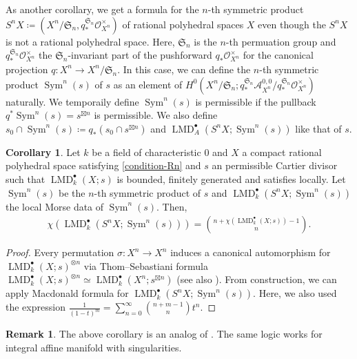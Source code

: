 \documentclass[a4paper,dvipdfmx,reqno,12pt]{amsart}
\theoremstyle{definition}
\newtheorem{corollary}[theorem]{Corollary}
\newtheorem{remark}[theorem]{Remark}
\newcommand{\deq}{\coloneqq}
\newcommand{\opn}[1]{\operatorname{#1}}
\numberwithin{equation}{section}
\begin{document}
As another corollary, we get a formula
for the $n$-th symmetric product 
$S^{n}X\deq 
(X^{n}/\mathfrak{S}_n,q_*^{\mathfrak{S}_n}\mathcal{O}_{X^{n}}^{\times})$ of 
rational polyhedral spaces $X$ even though 
the $S^{n}X$ is not a rational polyhedral space. 
Here, $\mathfrak{S}_n$ is the $n$-th permuation group 
and $q_*^{\mathfrak{S}_n}\mathcal{O}_{X^{n}}^{\times}$ the $\mathfrak{S}_n$-invariant 
part of the pushforward $q_* \mathcal{O}_{X^{n}}^{\times}$ for the canonical projection 
$q\colon X^{n}\to X^{n}/\mathfrak{S}_{n}$. In this case, 
we can define the $n$-th symmetric product
$\opn{Sym}^{n}(s)$ of 
$s$ as an element of $H^{0}(X^{n}/\mathfrak{S}_n;
q_*^{\mathfrak{S}_n}\mathcal{A}^{0,0}_{X^{n}}/
q_*^{\mathfrak{S}_n}\mathcal{O}_{X^{n}}^{\times})$
naturally.
We temporaily define $\opn{Sym}^{n}(s)$ is permissible if
the pullback $q^{*} \opn{Sym}^{n}(s)=s^{\boxtimes n}$ is 
permissible. We also define 
$s_0 \cap \opn{Sym}^{n}(s)\deq q_*(s_0\cap s^{\boxtimes n})$ 
and $\opn{LMD}^{\bullet}_{A}(S^{n}X;\opn{Sym}^{n}(s))$ like 
that of $s$.
\begin{corollary}
Let $k$ be a field of characteristic $0$ and $X$ a compact rational 
polyhedral space satisfying \cref{condition-Rn} 
and $s$ an permissible Cartier divisor 
such that $\opn{LMD}^{\bullet}_k(X;s)$ is bounded, 
finitely generated and 
satisfies \cite[Assumption 1.1.1]{MR2031639} locally.
Let $\opn{Sym}^{n}(s)$ be the $n$-th symmetric product of 
$s$ and
$\opn{LMD}^{\bullet}_{k}(S^{n}X;\opn{Sym}^{n}(s))$
the local Morse data of $\opn{Sym}^{n}(s)$.
Then,
\begin{align}
\chi(\opn{LMD}_k^{\bullet}(S^{n}X;\opn{Sym}^{n}(s)))=
\binom{n+\chi(\opn{LMD}_{k}^{\bullet}(X;s))-1
}{n}.
\end{align}

\end{corollary}
\begin{proof} 
Every permutation
$\sigma \colon X^{n}\to X^{n}$ induces a canonical 
automorphism for
$\opn{LMD}^{\bullet}_k(X;s)^{\otimes n}$ via
Thom--Sebastiani formula 
$\opn{LMD}^{\bullet}_k(X;s)^{\otimes n}\simeq 
\opn{LMD}^{\bullet}_k(X^{n};s^{\boxtimes n})$
(see also \cite[Corollary 1.3.1]{MR2031639}). 
From construction,
we can apply Macdonald formula \cite{MR143204} for 
$\opn{LMD}_k^{\bullet}(S^{n}X;\opn{Sym}^{n}(s))$.
Here, we also used the expression 
$\frac{1}{(1-t)^{m}}=\sum_{n=0}^{\infty}\binom{n+m-1}{n}t^{n}$.
\end{proof}

\begin{remark}
The above corollary is an analog of 
\cite[Lemma 5.1]{MR1795551}.
The same logic works for integral affine manifold with
singularities.
\end{remark}
\end{document}
